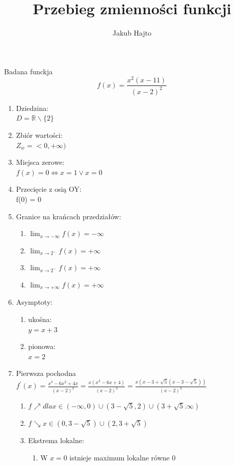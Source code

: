 \documentclass[11pt]{scrartcl}
\title{Przebieg zmienności funkcji}
\author{Jakub Hajto}
\begin{document}
	\maketitle
	\begin{center}
	Badana funckja $$ f(x) = \frac{x^2(x-11)}{(x-2)^2} $$
	\end{center}
	\begin{enumerate}
		\item Dziedzina: \\
			$ D = \mathbb{R} \backslash \{2\} $
		\item Zbiór wartości: \\
			$ Z_w = <0, +\infty) $
		\item Miejsca zerowe: \\
			$ f(x) = 0 \Longleftrightarrow x = 1 \vee x = 0 $
		\item Przecięcie z osią OY: \\
			f(0) = 0
		\item Granice na krańcach przedziałów:
			\begin{enumerate}
				\item $ \lim_{x\to-\infty} f(x) = -\infty $
				\item $ \lim_{x\to2^-} f(x) = +\infty $
				\item $ \lim_{x\to2^-} f(x) = +\infty $
				\item $ \lim_{x\to+\infty} f(x) = +\infty $
			\end{enumerate}
		\item Asymptoty:
			\begin{enumerate}
				\item ukośna: \\
					$ y = x + 3$
				\item pionowa: \\
					$ x=2 $
			\end{enumerate}
		\item Pierwsza pochodna \\
			$ f^{\prime}(x) = \frac{x^3 -6x^2 +4x}{(x-2)^3} =  \frac{x(x^2 -6x +4)}{(x-2)^3}=  \frac{x(x - 3 + \sqrt{5}(x - 3 - \sqrt{5}))}{(x-2)^3} $
			\begin{enumerate}
				\item $ f\nearrow dla x \in (-\infty, 0) \cup (3-\sqrt{5}, 2) \cup ( 3+\sqrt{5}. \infty) $
				\item $ f\searrow x \in ( 0, 3-\sqrt{5}) \cup (2 , 3+\sqrt{5}) $
				\item Ekstrema lokalne:
				\begin{enumerate}
					\item W $ x = 0 $ istnieje maximum lokalne równe $ 0 $

\end{enumerate}
\end{enumerate}
\end{enumerate}
\end{document}
